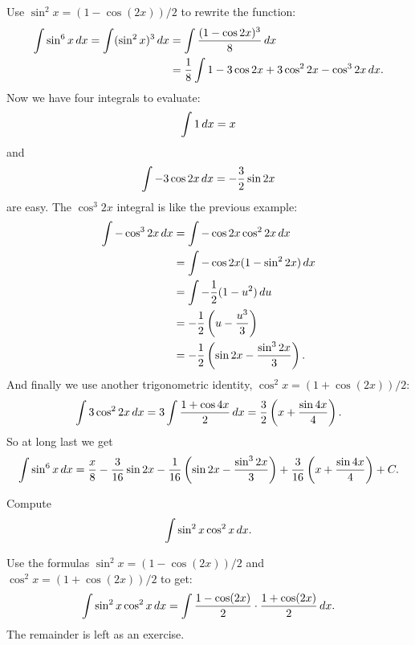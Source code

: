 \begin{solution}
Use $\sin^2x =(1-\cos(2x))/2$ to rewrite the function:
\begin{align*}
  \int \sin^6 x\, d x=\int (\sin^2 x)^3\, d x&=
  \int {(1-\cos 2x)^3\over 8}\, d x \\
  &={1\over 8}\int 1-3\cos 2x+3\cos^2 2x-\cos^3 2x\, d x.
\end{align*}
Now we have four integrals to evaluate:
$$\int 1\, d x=x$$
and
$$\int -3\cos 2x\, d x = -{3\over 2}\sin 2x$$
are easy. The $\cos^3 2x$ integral is like the previous example:
\begin{align*}
  \int -\cos^3 2x\, d x&=\int -\cos 2x\cos^2 2x\, d x \\
  &=\int -\cos 2x(1-\sin^2 2x)\, d x \\
  &=\int -{1\over 2}(1-u^2)\, d u \\
  &=-{1\over 2}\left(u-{u^3\over 3}\right) \\
  &=-{1\over 2}\left(\sin 2x-{\sin^3 2x\over 3}\right).
\end{align*}
And finally we use another trigonometric identity,
$\cos^2x=(1+\cos(2x))/2$:
$$
  \int 3\cos^2 2x\, d x=3\int {1+\cos 4x\over 2}\, d x=
  {3\over 2}\left(x+{\sin 4x\over 4}\right).
$$
So at long last we get
$$
  \int \sin^6 x\, d x = {x\over8} -{3\over 16}\sin 2x 
  -{1\over 16}\left(\sin 2x-{\sin^3 2x\over 3}\right)
  +{3\over 16}\left(x+{\sin 4x\over 4}\right)+C.
$$
\end{solution}

\begin{example}
Compute 
\[
\int \sin^2x\cos^2x\, d x.
\]
\end{example}
\begin{solution} 
Use the formulas
$\sin^2x =(1-\cos(2x))/2$ and $\cos^2x =(1+\cos(2x))/2$ to get:
$$
  \int \sin^2x\cos^2x\, d x=\int {1-\cos(2x)\over2}\cdot
  {1+\cos(2x)\over2}\, d x.
$$
The remainder is left as an exercise.
\end{solution}

